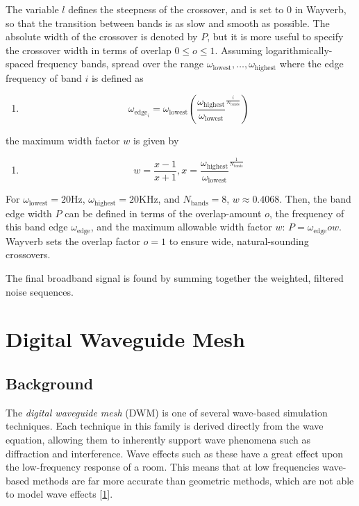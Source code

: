 \documentclass[]{scrreprt}
\providecommand{\tightlist}{%
  \setlength{\itemsep}{0pt}\setlength{\parskip}{0pt}}
\begin{document}
The variable \(l\) defines the steepness of the crossover, and is set to
0 in Wayverb, so that the transition between bands is as slow and smooth
as possible. The absolute width of the crossover is denoted by \(P\),
but it is more useful to specify the crossover width in terms of overlap
\(0 \leq o \leq 1\). Assuming logarithmically-spaced frequency bands,
spread over the range
\(\omega_\text{lowest}, \dots, \omega_\text{highest}\) where the edge
frequency of band \(i\) is defined as

\begin{enumerate}
\def\labelenumi{(\arabic{enumi})}
\setcounter{enumi}{14}
\tightlist
\item
  \[\omega_{\text{edge}_i}=\omega_\text{lowest}\left(\frac{\omega_\text{highest}}{\omega_\text{lowest}}^\frac{i}{N_\text{bands}}\right)\]
\end{enumerate}

the maximum width factor \(w\) is given by

\begin{enumerate}
\def\labelenumi{(\arabic{enumi})}
\setcounter{enumi}{15}
\tightlist
\item
  \[w=\frac{x-1}{x+1},
  x=\frac{\omega_\text{highest}}{\omega_\text{lowest}}^\frac{1}{N_\text{bands}}\]
\end{enumerate}

For \(\omega_\text{lowest}=20\text{Hz}\),
\(\omega_\text{highest}=20\text{KHz}\), and \(N_\text{bands}=8\),
\(w \approx 0.4068\). Then, the band edge width \(P\) can be defined in
terms of the overlap-amount \(o\), the frequency of this band edge
\(\omega_\text{edge}\), and the maximum allowable width factor \(w\):
\(P=\omega_\text{edge}ow\). Wayverb sets the overlap factor \(o=1\) to
ensure wide, natural-sounding crossovers.

The final broadband signal is found by summing together the weighted,
filtered noise sequences.

\chapter{Digital Waveguide Mesh}\label{digital-waveguide-mesh}

\section{Background}\label{background-2}

The \emph{digital waveguide mesh} (DWM) is one of several wave-based
simulation techniques. Each technique in this family is derived directly
from the wave equation, allowing them to inherently support wave
phenomena such as diffraction and interference. Wave effects such as
these have a great effect upon the low-frequency response of a room.
This means that at low frequencies wave-based methods are far more
accurate than geometric methods, which are not able to model wave
effects {[}\protect\hyperlink{ref-southernux5fspatialux5f2011}{1}{]}.
\end{document}
